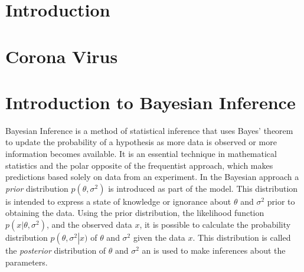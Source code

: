 \documentclass[12pt]{book}
\begin{document}
\tableofcontents
\chapter{Introduction}
\chapter{Corona Virus}
\chapter{Introduction to Bayesian Inference}
Bayesian Inference is a method of statistical inference that uses Bayes' theorem to update the probability of a hypothesis as more data is observed or more information becomes available. It is an essential technique in mathematical statistics and the polar opposite of the frequentist approach, which makes predictions based solely on data from an experiment. In the Bayesian approach a \textit{prior} distribution $p\left(\theta, \sigma^2\right)$ is introduced as part of the model. This distribution is intended to express a state of knowledge or ignorance about $\theta$ and $\sigma^2$ prior to obtaining the data. Using the prior distribution, the likelihood function $p\left(x|\theta,\sigma^2\right)$, and the observed data $x$, it is possible to calculate the probability distribution $p\left(\theta,\sigma^2\right|x)$ of $\theta$ and $\sigma^2$ given the data $x$. This distribution is called the \textit{posterior} distribution of $\theta$ and $\sigma^2$ an is used to make inferences about the parameters. \autocite[Cf.][]{box2011bayesian}
\end{document}
